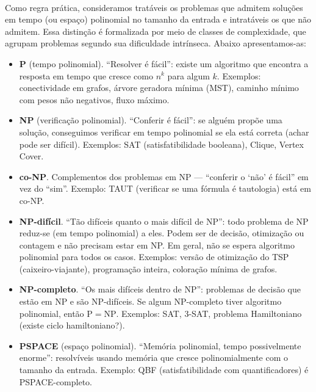\documentclass[12pt,a4paper]{article}
\def\emph#1{#1}%
\begin{document}
\paragraph{}
Como regra prática, consideramos \emph{tratáveis} os problemas que admitem soluções em tempo (ou espaço) \emph{polinomial} no tamanho da entrada e \emph{intratáveis} os que não admitem. Essa distinção é formalizada por meio de \emph{classes de complexidade}, que agrupam problemas segundo sua dificuldade intrínseca. Abaixo apresentamos-as:

\begin{itemize}\setlength{\itemsep}{2pt}
    \item \textbf{P} (tempo polinomial). “Resolver é fácil”: existe um algoritmo que encontra a resposta em tempo que cresce como \(n^k\) para algum \(k\). Exemplos: conectividade em grafos, árvore geradora mínima (MST), caminho mínimo com pesos não negativos, fluxo máximo.
    \item \textbf{NP} (verificação polinomial). “Conferir é fácil”: se alguém propõe uma solução, conseguimos \emph{verificar} em tempo polinomial se ela está correta (achar pode ser difícil). Exemplos: \emph{SAT} (satisfatibilidade booleana), \emph{Clique}, \emph{Vertex Cover}.
    \item \textbf{co-NP}. Complementos dos problemas em NP — “conferir o ‘não’ é fácil” em vez do “sim”. Exemplo: \emph{TAUT} (verificar se uma fórmula é tautologia) está em co-NP.
    \item \textbf{NP-difícil}. “Tão difíceis quanto o mais difícil de NP”: todo problema de NP reduz-se (em tempo polinomial) a eles. Podem ser de decisão, otimização ou contagem e \emph{não precisam} estar em NP. Em geral, não se espera algoritmo polinomial para todos os casos. Exemplos: versão de otimização do \emph{TSP} (caixeiro-viajante), programação inteira, coloração mínima de grafos.
    \item \textbf{NP-completo}. “Os mais difíceis \emph{dentro} de NP”: problemas de decisão que estão em NP e são NP-difíceis. Se algum NP-completo tiver algoritmo polinomial, então \(\mathrm{P}=\mathrm{NP}\). Exemplos: \emph{SAT}, \emph{3-SAT}, problema \emph{Hamiltoniano} (existe ciclo hamiltoniano?).
    \item \textbf{PSPACE} (espaço polinomial). “Memória polinomial, tempo possivelmente enorme”: resolvíveis usando memória que cresce polinomialmente com o tamanho da entrada. Exemplo: \emph{QBF} (satisfatibilidade com quantificadores) é PSPACE-completo.
\end{itemize}
\end{document}
